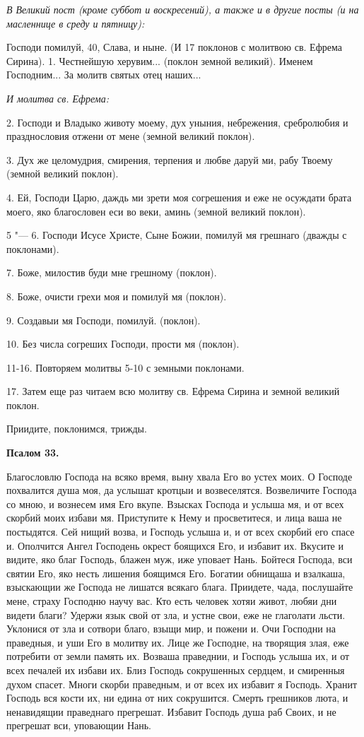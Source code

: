 \itshape В Великий пост (кроме суббот и воскресений), а также и в другие посты (и на масленнице в среду и пятницу):\normalfont{}


Господи помилуй, 40, Слава, и ныне. (И 17 поклонов с молитвою св. Ефрема Сирина). 1. Честнейшую херувим... (поклон земной великий). Именем Господним... За молитв святых отец наших...


\itshape И молитва св. Ефрема:\normalfont{}


2. Господи и Владыко животу моему, дух уныния, небрежения, сребролюбия и празднословия отжени от мене (земной великий поклон).


3. Дух же целомудрия, смирения, терпения и любве даруй ми, рабу Твоему (земной великий поклон).


4. Ей, Господи Царю, даждь ми зрети моя согрешения и еже не осуждати брата моего, яко благословен еси во веки, аминь (земной великий поклон).


5 "--- 6. Господи Исусе Христе, Сыне Божии, помилуй мя грешнаго (дважды с поклонами).

7. Боже, милостив буди мне грешному (поклон).


8. Боже, очисти грехи моя и помилуй мя (поклон).


9. Создавыи мя Господи, помилуй. (поклон).


10. Без числа согреших Господи, прости мя (поклон).


11-16. Повторяем молитвы 5-10 с земными поклонами.


17. Затем еще раз читаем всю молитву св. Ефрема Сирина и земной великий поклон.


Приидите, поклонимся, трижды.


\medskip


\bfseries Псалом 33.\normalfont{}\nopagebreak


Благословлю Господа на всяко время, выну хвала Его во устех моих. О Господе похвалится душа моя, да услышат кротцыи и возвеселятся. Возвеличите Господа со мною, и вознесем имя Его вкупе. Взысках Господа и услыша мя, и от всех скорбий моих избави мя. Приступите к Нему и просветитеся, и лица ваша не постыдятся. Сей нищий возва, и Господь услыша и, и от всех скорбий его спасе и. Ополчится Ангел Господень окрест боящихся Его, и избавит их. Вкусите и видите, яко благ Господь, блажен муж, иже уповает Нань. Бойтеся Господа, вси святии Его, яко несть лишения боящимся Его. Богатии обнищаша и взалкаша, взыскающии же Господа не лишатся всякаго блага. Приидете, чада, послушайте мене, страху Господню научу вас. Кто есть человек хотяи живот, любяи дни видети благи? Удержи язык свой от зла, и устне свои, еже не глаголати льсти. Уклонися от зла и сотвори благо, взыщи мир, и пожени и. Очи Господни на праведныя, и уши Его в молитву их. Лице же Господне, на творящия злая, еже потребити от земли память их. Возваша праведнии, и Господь услыша их, и от всех печалей их избави их. Близ Господь сокрушенных сердцем, и смиренныя духом спасет. Многи скорби праведным, и от всех их избавит я Господь. Хранит Господь вся кости их, ни едина от них сокрушится. Смерть грешников люта, и ненавидящии праведнаго прегрешат. Избавит Господь душа раб Своих, и не прегрешат вси, уповающии Нань.


